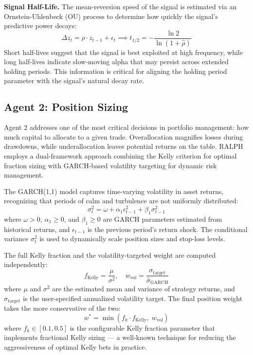 \documentclass[conference]{IEEEtran}
\begin{document}
\textbf{Signal Half-Life.} The mean-reversion speed of the signal is estimated via an Ornstein-Uhlenbeck (OU) process to determine how quickly the signal's predictive power decays:
\begin{equation}
    \Delta z_t = \rho \cdot z_{t-1} + \epsilon_t \implies t_{1/2} = -\frac{\ln 2}{\ln(1 + \hat{\rho})}
    \label{eq:halflife}
\end{equation}
Short half-lives suggest that the signal is best exploited at high frequency, while long half-lives indicate slow-moving alpha that may persist across extended holding periods. This information is critical for aligning the holding period parameter with the signal's natural decay rate.

\subsection{Agent 2: Position Sizing}

Agent 2 addresses one of the most critical decisions in portfolio management: how much capital to allocate to a given trade. Overallocation magnifies losses during drawdowns, while underallocation leaves potential returns on the table. RALPH employs a dual-framework approach combining the Kelly criterion for optimal fraction sizing with GARCH-based volatility targeting for dynamic risk management.

The GARCH(1,1) model captures time-varying volatility in asset returns, recognizing that periods of calm and turbulence are not uniformly distributed:
\begin{equation}
    \sigma_t^2 = \omega + \alpha_1 \epsilon_{t-1}^2 + \beta_1 \sigma_{t-1}^2
    \label{eq:garch}
\end{equation}
where $\omega > 0$, $\alpha_1 \geq 0$, and $\beta_1 \geq 0$ are GARCH parameters estimated from historical returns, and $\epsilon_{t-1}$ is the previous period's return shock. The conditional variance $\sigma_t^2$ is used to dynamically scale position sizes and stop-loss levels.

The full Kelly fraction and the volatility-targeted weight are computed independently:
\begin{equation}
    f_{\text{Kelly}} = \frac{\mu}{\sigma^2}, \quad w_{\text{vol}} = \frac{\sigma_{\text{target}}}{\hat{\sigma}_{\text{GARCH}}}
\end{equation}
where $\mu$ and $\sigma^2$ are the estimated mean and variance of strategy returns, and $\sigma_{\text{target}}$ is the user-specified annualized volatility target. The final position weight takes the more conservative of the two:
\begin{equation}
    w^* = \min\left(f_k \cdot f_{\text{Kelly}}, \; w_{\text{vol}}\right)
    \label{eq:final_weight}
\end{equation}
where $f_k \in [0.1, 0.5]$ is the configurable Kelly fraction parameter that implements fractional Kelly sizing --- a well-known technique for reducing the aggressiveness of optimal Kelly bets in practice.
\end{document}
